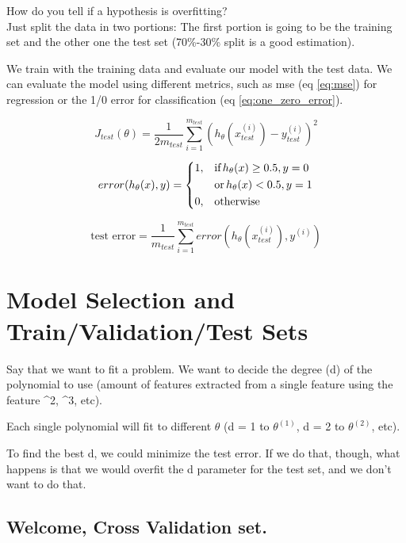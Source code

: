 \documentclass[10pt]{extarticle}
\begin{document}
How do you tell if a hypothesis is overfitting?\\Just split the data in
two portions: The first portion is going to be the training set and the
other one the test set (70\%-30\% split is a good estimation).

We train with the training data and evaluate our model with the test
data. We can evaluate the model using different metrics, such as mse (eq
\ref{eq:mse}) for regression or the 1/0 error for classification (eq
\ref{eq:one_zero_error}).

\begin{equation} \label{eq:mse}
J_{test}(\theta) = \frac{1}{2m_{test}} \sum_{i=1}^{m_{test}}(h_\theta(x_{test}^{(i)}) - y_{test}^{(i)})^2
\end{equation}

\begin{equation} 
error(h_\theta(x), y) = 
\begin{dcases}
    1, & \text{if\,} h_\theta(x) \geq 0.5, y = 0 \\ 
       & \text{or\,} h_\theta(x) < 0.5, y = 1 \\
    0, & \text{otherwise}
\end{dcases} 
\end{equation}

\begin{equation} \label{eq:one_zero_error}
\text{test error} = \frac{1}{m_{test}} \sum_{i=1}^{m_{test}} error(h_\theta(x_{test}^{(i)}), y^{(i)})
\end{equation}

\section{Model Selection and Train/Validation/Test
Sets}\label{model-selection-and-trainvalidationtest-sets}

Say that we want to fit a problem. We want to decide the degree (d) of
the polynomial to use (amount of features extracted from a single
feature using the feature \^{}2, \^{}3, etc).

Each single polynomial will fit to different $\theta$ (d = 1 to
$\theta^{(1)}$, d = 2 to $\theta^{(2)}$, etc).

To find the best d, we could minimize the test error. If we do that,
though, what happens is that we would overfit the d parameter for the
test set, and we don't want to do that.

\subsection{Welcome, Cross Validation
set.}\label{welcome-cross-validation-set.}
\end{document}
